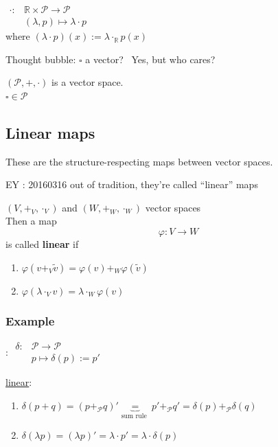 $\begin{aligned} 
\cdot : & \mathbb{R} \times \mathcal{P} \to \mathcal{P} \\
& (\lambda, p) \mapsto \lambda \cdot p \end{aligned}$ \\
where $(\lambda \cdot p)(x) := \lambda \cdot_{\mathbb{R}} p(x)$

Thought bubble: $\square$ a vector?  \qquad \, Yes, but who cares?

$(\mathcal{P}, + ,\cdot )$ is a vector space.   \\
$\square \in \mathcal{P}$

\subsection{Linear maps}

These are the structure-respecting maps between vector spaces.  

EY : 20160316 out of tradition, they're called ``linear'' maps

\begin{definition}
	$(V,+_V,\cdot_V)$ and $(W,+_W,\cdot_W)$ vector spaces \\
	Then a map
	\[
	\varphi : V \to W 
	\]
	is called \textbf{linear} if 
	\begin{enumerate}
		\item[(i)] $\varphi(v+_V \widetilde{v}) = \varphi(v) +_W \varphi(\widetilde{v}) $  
		\item[(ii)] $\varphi(\lambda \cdot_V v) = \lambda \cdot_W \varphi(v)$
	\end{enumerate}
\end{definition}

\subsubsection*{Example}:
$\begin{aligned}
\delta : & \mathcal{P} \to \mathcal{P}  \\
& p \mapsto \delta(p) := p' \end{aligned}$

\underline{linear}: \begin{enumerate}
	\item[(i)] $\delta(p+q) = (p+_{\mathcal{P}} q)' \underbrace{=}_{\text{sum rule }} p' +_{\mathcal{P}} q' = \delta(p) +_{\mathcal{P}} \delta(q) $
	\item[(ii)] $\delta(\lambda p) = (\lambda p)' = \lambda \cdot p'= \lambda \cdot \delta(p)$
\end{enumerate}

